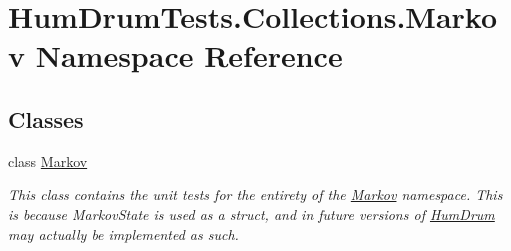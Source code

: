 \hypertarget{namespaceHumDrumTests_1_1Collections_1_1Markov}{}\section{Hum\+Drum\+Tests.\+Collections.\+Markov Namespace Reference}
\label{namespaceHumDrumTests_1_1Collections_1_1Markov}
\subsection*{Classes}
\begin{DoxyCompactItemize}
\item 
class \hyperlink{classHumDrumTests_1_1Collections_1_1Markov_1_1Markov}{Markov}
\begin{DoxyCompactList}\small\item\em This class contains the unit tests for the entirety of the \hyperlink{classHumDrumTests_1_1Collections_1_1Markov_1_1Markov}{Markov} namespace. This is because Markov\+State is used as a struct, and in future versions of \hyperlink{namespaceHumDrum}{Hum\+Drum} may actually be implemented as such. \end{DoxyCompactList}\end{DoxyCompactItemize}
